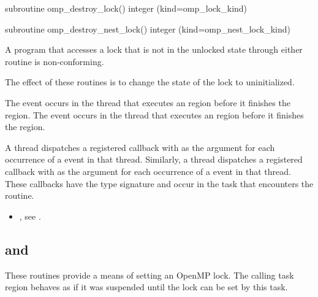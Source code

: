 \begin{fortranspecific}
\begin{ompfSubroutine}
subroutine omp_destroy_lock()
integer (kind=omp_lock_kind) 

subroutine omp_destroy_nest_lock()
integer (kind=omp_nest_lock_kind) 
\end{ompfSubroutine}
\end{fortranspecific}

\constraints
A program that accesses a lock that is not in the unlocked state 
through either routine is non-conforming.

\effect
The effect of these routines is to change the state of the lock to uninitialized.

\events
The  event occurs in the thread that executes an 
 region before it finishes the region. The 
 event occurs in the thread that 
executes an  region before it finishes the region.

\tools
A thread dispatches a registered  
callback with  as the  argument for each 
occurrence of a  event in that thread. Similarly, 
a thread dispatches a registered  
callback with  as the  argument for each 
occurrence of a  event in that thread. These 
callbacks have the type signature 
and occur in the task that encounters the routine.

\crossreferences
\begin{itemize}
\item {}, see
.
\end{itemize}



\subsection{ and }
\label{subsec:omp_set_lock and omp_set_nest_lock}
\summary
These routines provide a means of setting an OpenMP lock. The calling
task region behaves as if it was suspended until the lock can be set
by this task.

